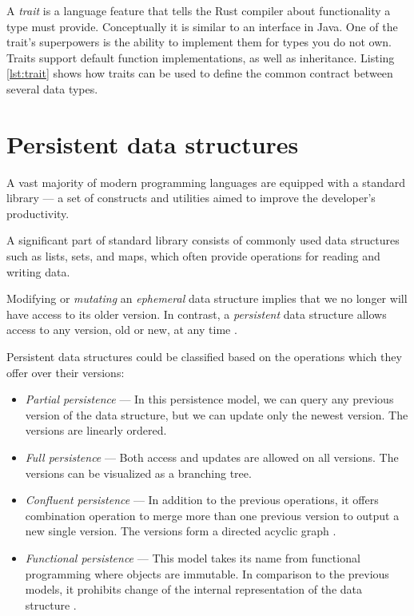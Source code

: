 A \emph{trait} is a language feature that tells the Rust compiler about functionality a type must provide. Conceptually it is similar to an interface in Java. One of the trait's superpowers is the ability to implement them for types you do not own. Traits support default function implementations, as well as inheritance. Listing \ref{lst:trait} shows how traits can be used to define the common contract between several data types.

\section{Persistent data structures}
\label{sec:psds}

A vast majority of modern programming languages are equipped with a standard library --- a set of constructs and utilities aimed to improve the developer's productivity.

A significant part of standard library consists of commonly used data structures such as lists, sets, and maps, which often provide operations for reading and writing data.

Modifying or \emph{mutating} an \emph{ephemeral} data structure implies that we no longer will have access to its older version. In contrast, a \emph{persistent} data structure allows access to any version, old or new, at any time \cite{making-data-structures-persistent}.

Persistent data structures could be classified based on the operations which they offer over their versions:
\begin{itemize}
    \item \textit{Partial persistence} --- In this persistence model, we can query any previous version of the data structure, but we can update only the newest version. The versions are linearly ordered.
    \item \textit{Full persistence} --- Both access and updates are allowed on all versions. The versions can be visualized as a branching tree.
    \item \textit{Confluent persistence} --- In addition to the previous operations, it offers combination operation to merge more than one previous version to output a new single version. The versions form a directed acyclic graph \cite{fully-persistent-lists-with-catenation}.
    \item \textit{Functional persistence} --- This model takes its name from functional programming where objects are immutable. In comparison to the previous models, it prohibits change of the internal representation of the data structure \cite{purely-functional-data-structures}.
\end{itemize}

